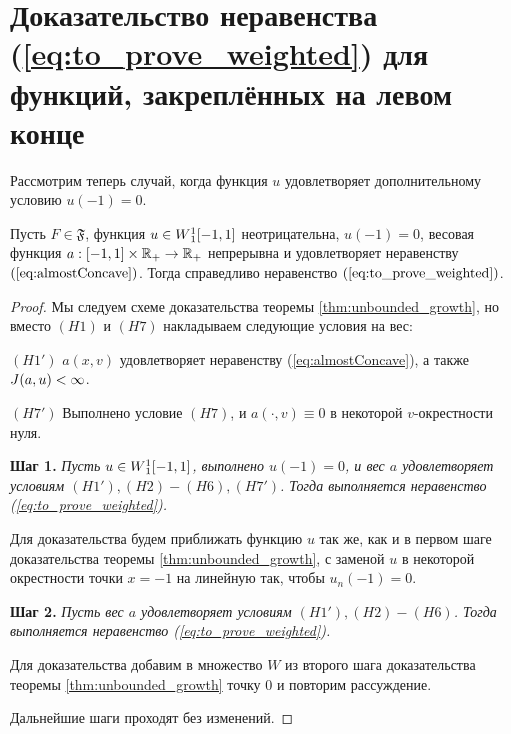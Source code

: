 \section{Доказательство неравенства (\ref{eq:to_prove_weighted}) для функций, закреплённых на левом конце}

Рассмотрим теперь случай, когда функция $u$ удовлетворяет дополнительному условию $u(-1) = 0$.
\begin{thm}
Пусть $F \in \mathfrak{F}$, функция $u \in W{}_1^1[-1, 1]$ неотрицательна, $u(-1) = 0$,
весовая функция $a: [-1, 1] \times \mathbb R_+ \to \mathbb R_+$ непрерывна и удовлетворяет неравенству $(\ref{eq:almostConcave})$.
Тогда справедливо неравенство $(\ref{eq:to_prove_weighted})$.
\end{thm}

\begin{proof}
Мы следуем схеме доказательства теоремы \ref{thm:unbounded_growth},
но вместо $(H1)$ и $(H7)$ накладываем следующие условия на вес:

\bigskip
\noindent
$(H1')$ $a(x, v)$ удовлетворяет неравенству (\ref{eq:almostConcave}), а также $J(a, u) < \infty$.

\bigskip
\noindent
$(H7')$ Выполнено условие $(H7)$, и $a(\cdot, v) \equiv 0$ в некоторой $v$-окрестности нуля.

\bigskip
\textbf{Шаг 1.}
\textit{Пусть $u \in W{}_1^1[-1, 1]$, выполнено $u(-1) = 0$, и вес $a$ удовлетворяет условиям $(H1'), (H2)-(H6), (H7')$.
Тогда выполняется неравенство (\ref{eq:to_prove_weighted}).}

Для доказательства будем приближать функцию $u$ так же, как и в первом шаге доказательства теоремы \ref{thm:unbounded_growth},
с заменой $u$ в некоторой окрестности точки $x = -1$ на линейную так, чтобы $u_n(-1) = 0$.

\bigskip
\textbf{Шаг 2.}
\textit{Пусть вес $a$ удовлетворяет условиям $(H1'), (H2)-(H6)$.
Тогда выполняется неравенство (\ref{eq:to_prove_weighted}).}

Для доказательства добавим в множество $W$ из второго шага доказательства теоремы \ref{thm:unbounded_growth} точку $0$
и повторим рассуждение.

\medskip

Дальнейшие шаги проходят без изменений.
\end{proof}
